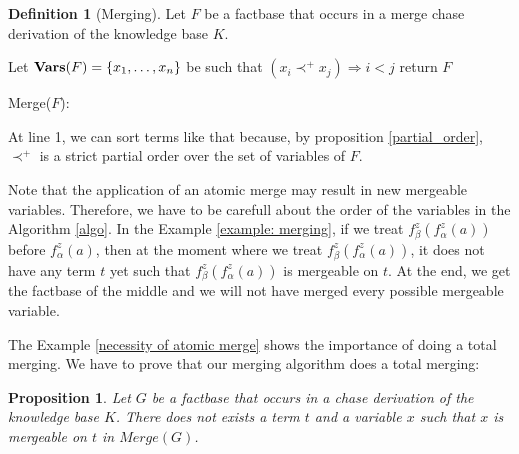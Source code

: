 \documentclass{article}
\newtheorem{proposition}{Proposition}[section]
\theoremstyle{definition}
\newtheorem{definition}{Definition}[section]
\theoremstyle{remark}
\newcommand{\Vars}{\textbf{Vars}}
\newcommand{\Merge}{\textit{Merge}}
\begin{document}
\begin{definition}[Merging]
Let $F$ be a factbase that occurs in a merge chase derivation of the knowledge base $K$.

\begin{algorithm}[H] \label{algo}
\SetAlgoLined


    Let $\textbf{\Vars}(F) = \{x_1,\ldots, x_n\}$ be such that $(x_i \prec^+ x_j) \Rightarrow i < j$ \;
return $F$
\caption{Merge($F$):}


\end{algorithm}
At line 1, we can sort terms like that because, by proposition \ref{partial_order}, $\prec^+$ is a strict partial order over the set of variables of $F$.
\end{definition}



Note that the application of an atomic merge may result in new mergeable variables. Therefore, we have to be carefull about the order of the variables in the Algorithm \ref{algo}. In the Example \ref{example: merging}, if we treat $f_\beta^z(f_\alpha^z(a))$ before $f_\alpha^z(a)$, then at the moment where we treat $f_\beta^z(f_\alpha^z(a))$, it does not have any term $t$ yet such that $f_\beta^z(f_\alpha^z(a))$ is mergeable on $t$. At the end, we get the factbase of the middle and we will not have merged every possible mergeable variable.


The Example \ref{necessity of atomic merge} shows the importance of doing a total merging. We have to prove that our merging algorithm does a total merging:

\begin{proposition}\label{no_more_siblings}
Let $G$ be a factbase that occurs in a chase derivation of the knowledge base $K$. There does not exists a term $t$ and a variable $x$ such that $x$ is mergeable on $t$ in $\Merge(G)$.
\end{proposition}
\end{document}
